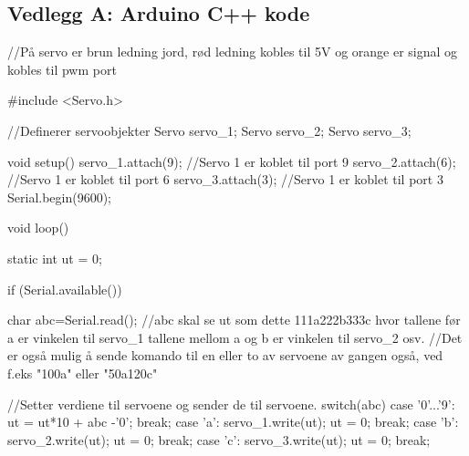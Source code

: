 \subsection{Vedlegg A: Arduino C++ kode}

//På servo er brun ledning jord, rød ledning kobles til 5V og orange er signal og kobles til pwm port

#include <Servo.h>

//Definerer servoobjekter
Servo servo_1; 
Servo servo_2;
Servo servo_3;

void setup(){
  servo_1.attach(9);  //Servo 1 er koblet til port 9
  servo_2.attach(6);  //Servo 1 er koblet til port 6
  servo_3.attach(3);  //Servo 1 er koblet til port 3
  Serial.begin(9600);
}

void loop(){
  
  static int ut = 0;
  
  if (Serial.available()){
    char abc=Serial.read(); //abc skal se ut som dette 111a222b333c hvor tallene før a er vinkelen til servo_1 tallene mellom a og b er vinkelen til servo_2 osv.
                            //Det er også mulig å sende komando til en eller to av servoene av gangen også, ved f.eks "100a" eller "50a120c"
    
    //Setter verdiene til servoene og sender de til servoene.
    switch(abc) {
      case '0'...'9':
        ut = ut*10 + abc -'0';
        break;
      case 'a':
        servo_1.write(ut);
        ut = 0;
        break;
      case 'b':
        servo_2.write(ut);
        ut = 0;
        break;
      case 'c':
        servo_3.write(ut);
        ut = 0;
        break;
    }
  }
  
}  
